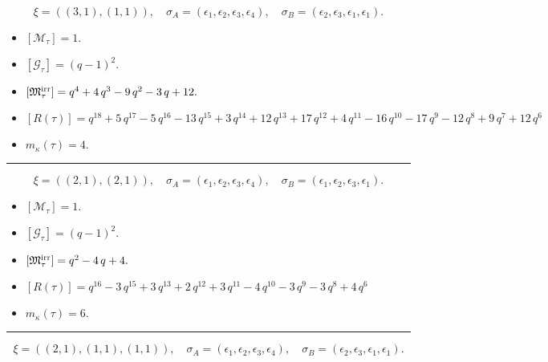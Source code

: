 \documentclass[10pt,a4paper]{amsart}
\begin{document}
$$\xi = ({(3, 1), (1, 1)}),\quad \sigma_A = ({{\epsilon_1, \epsilon_2, \epsilon_3}, {\epsilon_4}}),\quad \sigma_B = ({{\epsilon_2, \epsilon_3, \epsilon_1}, {\epsilon_1}}).$$

\begin{itemize}
 \item $[\mathcal{M}_{\tau}] = 1 .$

 \item $[\mathcal{G}_{\tau}] = {\left(q - 1\right)}^{2} .$

 \item $[{\frak M}_{\tau}^{\textrm{irr}}] = q^{4} + 4 \, q^{3} - 9 \, q^{2} - 3 \, q + 12 .$

 \item $[R(\tau)] = q^{18} + 5 \, q^{17} - 5 \, q^{16} - 13 \, q^{15} + 3 \, q^{14} + 12 \, q^{13} + 17 \, q^{12} + 4 \, q^{11} - 16 \, q^{10} - 17 \, q^{9} - 12 \, q^{8} + 9 \, q^{7} + 12 \, q^{6} $

 \item $m_{\kappa}(\tau) = 4 .$

 \end{itemize}
\noindent\rule{8cm}{0.4pt}

$$\xi = ({(2, 1), (2, 1)}),\quad \sigma_A = ({{\epsilon_1, \epsilon_2}, {\epsilon_3, \epsilon_4}}),\quad \sigma_B = ({{\epsilon_1, \epsilon_2}, {\epsilon_3, \epsilon_1}}).$$

\begin{itemize}
 \item $[\mathcal{M}_{\tau}] = 1 .$

 \item $[\mathcal{G}_{\tau}] = {\left(q - 1\right)}^{2} .$

 \item $[{\frak M}_{\tau}^{\textrm{irr}}] = q^{2} - 4 \, q + 4 .$

 \item $[R(\tau)] = q^{16} - 3 \, q^{15} + 3 \, q^{13} + 2 \, q^{12} + 3 \, q^{11} - 4 \, q^{10} - 3 \, q^{9} - 3 \, q^{8} + 4 \, q^{6} $

 \item $m_{\kappa}(\tau) = 6 .$

 \end{itemize}
\noindent\rule{8cm}{0.4pt}

$$\xi = ({(2, 1), (1, 1), (1, 1)}),\quad \sigma_A = ({{\epsilon_1, \epsilon_2}, {\epsilon_3}, {\epsilon_4}}),\quad \sigma_B = ({{\epsilon_2, \epsilon_3}, {\epsilon_1}, {\epsilon_1}}).$$
\end{document}
